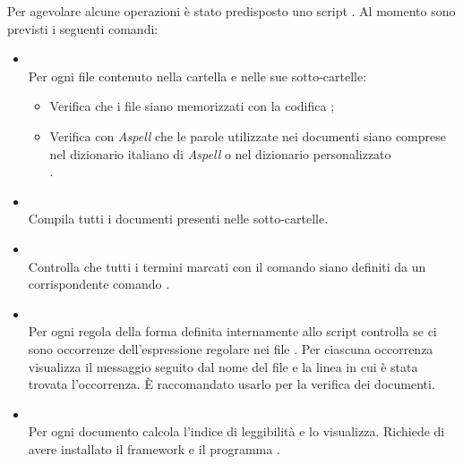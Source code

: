 Per agevolare alcune operazioni è stato predisposto uno script . Al momento sono previsti i seguenti comandi:
\begin{itemize}

\item \textbf{} \\
Per ogni file  contenuto nella cartella e nelle sue sotto-cartelle:
\begin{itemize}
	\item Verifica che i file siano memorizzati con la codifica ;
	\item Verifica con \emph{Aspell} che le parole utilizzate nei documenti siano comprese nel dizionario italiano di \emph{Aspell} o nel dizionario personalizzato \\
	.
\end{itemize}
	
\item \textbf{} \\
Compila tutti i documenti presenti nelle sotto-cartelle.

\item \textbf{} \\
Controlla che tutti i termini marcati con il comando \code{\\glossario\{\dots\}} siano definiti da un corrispondente comando .

\item \textbf{} \\
Per ogni regola della forma  definita internamente allo script controlla se ci sono occorrenze dell'espressione regolare  nei file . Per ciascuna occorrenza visualizza il messaggio  seguito dal nome del file e la linea in cui è stata trovata l'occorrenza. È raccomandato usarlo per la verifica dei documenti.

\item \textbf{} \\
Per ogni documento  calcola l'indice di leggibilità  e lo visualizza. Richiede di avere installato il framework  e il programma .

\end{itemize}

